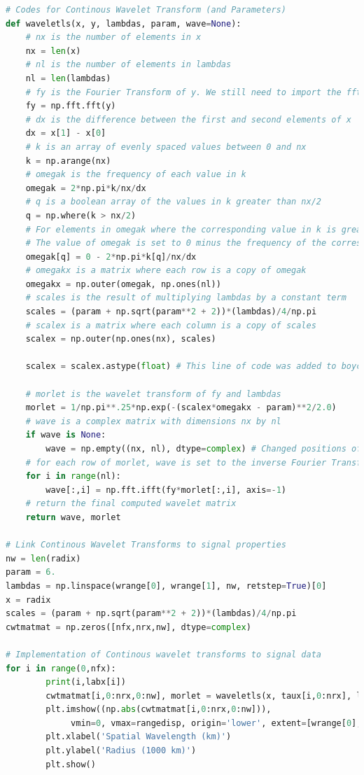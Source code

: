 \documentclass{article}
\begin{document}
\begin{lstlisting}[language=Python, caption=Python code snippet for Spiral Density Wave Analysis.]
# Codes for Continous Wavelet Transform (and Parameters)
def waveletls(x, y, lambdas, param, wave=None):
    # nx is the number of elements in x
    nx = len(x)
    # nl is the number of elements in lambdas
    nl = len(lambdas)
    # fy is the Fourier Transform of y. We still need to import the fft module for this step.
    fy = np.fft.fft(y)
    # dx is the difference between the first and second elements of x
    dx = x[1] - x[0]
    # k is an array of evenly spaced values between 0 and nx
    k = np.arange(nx)
    # omegak is the frequency of each value in k
    omegak = 2*np.pi*k/nx/dx
    # q is a boolean array of the values in k greater than nx/2
    q = np.where(k > nx/2)
    # For elements in omegak where the corresponding value in k is greater than nx/2,
    # The value of omegak is set to 0 minus the frequency of the corresponding value in k
    omegak[q] = 0 - 2*np.pi*k[q]/nx/dx
    # omegakx is a matrix where each row is a copy of omegak
    omegakx = np.outer(omegak, np.ones(nl))
    # scales is the result of multiplying lambdas by a constant term
    scales = (param + np.sqrt(param**2 + 2))*(lambdas)/4/np.pi
    # scalex is a matrix where each column is a copy of scales
    scalex = np.outer(np.ones(nx), scales)
    
    scalex = scalex.astype(float) # This line of code was added to boycott the issues with the lambdas parameter
    
    # morlet is the wavelet transform of fy and lambdas
    morlet = 1/np.pi**.25*np.exp(-(scalex*omegakx - param)**2/2.0)
    # wave is a complex matrix with dimensions nx by nl
    if wave is None:
        wave = np.empty((nx, nl), dtype=complex) # Changed positions of nx and nl 2/14/2023
    # for each row of morlet, wave is set to the inverse Fourier Transform of the product of fy and the row
    for i in range(nl):
        wave[:,i] = np.fft.ifft(fy*morlet[:,i], axis=-1)
    # return the final computed wavelet matrix
    return wave, morlet

# Link Continous Wavelet Transforms to signal properties
nw = len(radix)
param = 6.
lambdas = np.linspace(wrange[0], wrange[1], nw, retstep=True)[0]
x = radix
scales = (param + np.sqrt(param**2 + 2))*(lambdas)/4/np.pi
cwtmatmat = np.zeros([nfx,nrx,nw], dtype=complex)

# Implementation of Continous wavelet transforms to signal data
for i in range(0,nfx):
        print(i,labx[i])
        cwtmatmat[i,0:nrx,0:nw], morlet = waveletls(x, taux[i,0:nrx], lambdas, param, wave=None)
        plt.imshow((np.abs(cwtmatmat[i,0:nrx,0:nw])),
             vmin=0, vmax=rangedisp, origin='lower', extent=[wrange[0],wrange[1],xr[0],xr[1]], aspect='auto')
        plt.xlabel('Spatial Wavelength (km)')
        plt.ylabel('Radius (1000 km)')
        plt.show()


\end{lstlisting}
\end{document}
